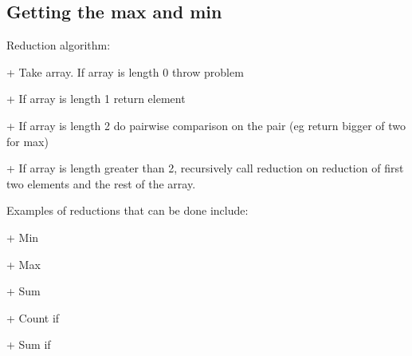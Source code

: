 
\subsection{Getting the max and min}

Reduction algorithm:

+ Take array. If array is length 0 throw problem

+ If array is length 1 return element

+ If array is length 2 do pairwise comparison on the pair (eg return bigger of two for max)

+ If array is length greater than 2, recursively call reduction on reduction of first two elements and the rest of the array.


Examples of reductions that can be done include:

+ Min

+ Max

+ Sum

+ Count if

+ Sum if
